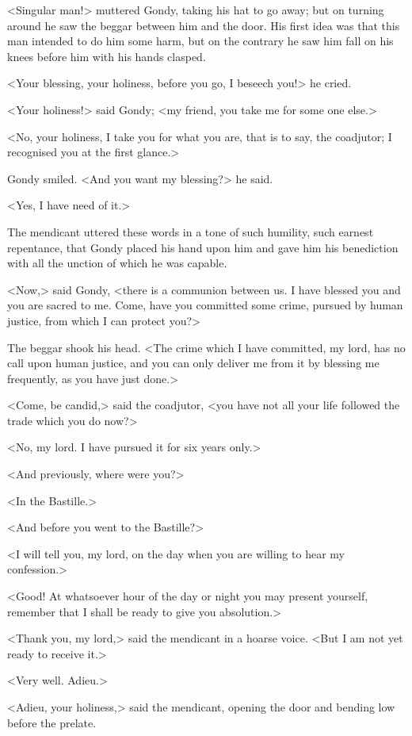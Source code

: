 <Singular man!> muttered Gondy, taking his hat to go away; but on turning around he saw the beggar between him and the door. His first idea was that this man intended to do him some harm, but on the contrary he saw him fall on his knees before him with his hands clasped.

<Your blessing, your holiness, before you go, I beseech you!> he cried.

<Your holiness!> said Gondy; <my friend, you take me for some one else.>

<No, your holiness, I take you for what you are, that is to say, the coadjutor; I recognised you at the first glance.>

Gondy smiled. <And you want my blessing?> he said.

<Yes, I have need of it.>

The mendicant uttered these words in a tone of such humility, such earnest repentance, that Gondy placed his hand upon him and gave him his benediction with all the unction of which he was capable.

<Now,> said Gondy, <there is a communion between us. I have blessed you and you are sacred to me. Come, have you committed some crime, pursued by human justice, from which I can protect you?>

The beggar shook his head. <The crime which I have committed, my lord, has no call upon human justice, and you can only deliver me from it by blessing me frequently, as you have just done.>

<Come, be candid,> said the coadjutor, <you have not all your life followed the trade which you do now?>

<No, my lord. I have pursued it for six years only.>

<And previously, where were you?>

<In the Bastille.>

<And before you went to the Bastille?>

<I will tell you, my lord, on the day when you are willing to hear my confession.>

<Good! At whatsoever hour of the day or night you may present yourself, remember that I shall be ready to give you absolution.>

<Thank you, my lord,> said the mendicant in a hoarse voice. <But I am not yet ready to receive it.>

<Very well. Adieu.>

<Adieu, your holiness,> said the mendicant, opening the door and bending low before the prelate. 